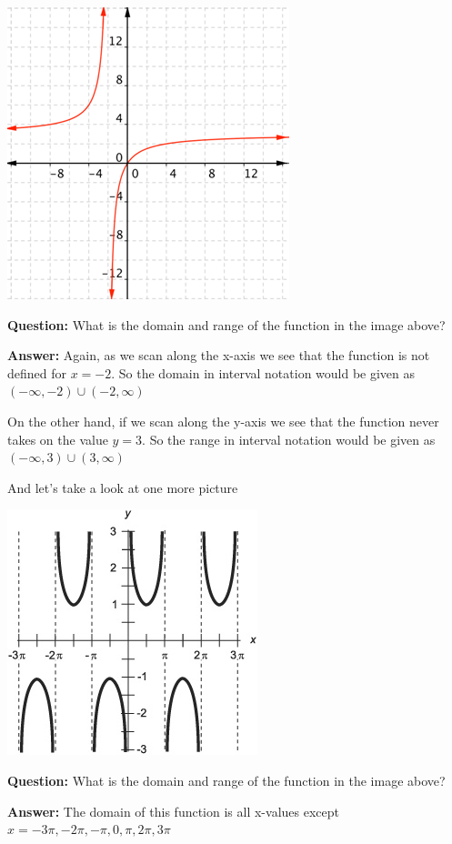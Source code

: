 \documentclass[12pt]{article}
\begin{document}
\centerline{\includegraphics{DomainAndRangePlot2.png}}

\textbf{Question:} What is the domain and range of the function in the image above?

\textbf{Answer:} Again, as we scan along the x-axis we see that the function is not defined for $x=-2$. So the domain in interval notation would be given as $(- \infty, -2) \cup (-2, \infty)$

On the other hand, if we scan along the y-axis we see that the function never takes on the value $y=3$. So the range in interval notation would be given as $(- \infty, 3) \cup (3, \infty)$

And let's take a look at one more picture

\centerline{\includegraphics{DomainAndRangePlot3.jpg}}

\textbf{Question:} What is the domain and range of the function in the image above?

\textbf{Answer:} The domain of this function is all x-values except $x = -3 \pi, -2 \pi, - \pi, 0, \pi, 2 \pi, 3 \pi$ 
\end{document}
